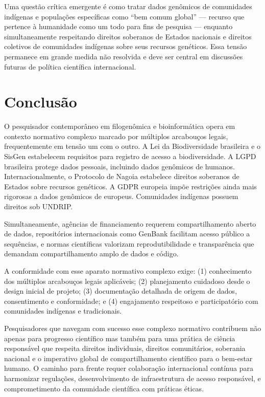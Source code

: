 Uma questão crítica emergente é como tratar dados genômicos de comunidades indígenas e populações específicas como ``bem comum global'' --- recurso que pertence à humanidade como um todo para fins de pesquisa --- enquanto simultaneamente respeitando direitos soberanos de Estados nacionais e direitos coletivos de comunidades indígenas sobre seus recursos genéticos. Essa tensão permanece em grande medida não resolvida e deve ser central em discussões futuras de política científica internacional.

\section{Conclusão}

O pesquisador contemporâneo em filogenômica e bioinformática opera em contexto normativo complexo marcado por múltiplos arcabouços legais, frequentemente em tensão um com o outro. A Lei da Biodiversidade brasileira e o SisGen estabelecem requisitos para registro de acesso a biodiversidade. A LGPD brasileira protege dados pessoais, incluindo dados genômicos de humanos. Internacionalmente, o Protocolo de Nagoia estabelece direitos soberanos de Estados sobre recursos genéticos. A GDPR europeia impõe restrições ainda mais rigorosas a dados genômicos de europeus. Comunidades indígenas possuem direitos sob UNDRIP.

Simultaneamente, agências de financiamento requerem compartilhamento aberto de dados, repositórios internacionais como GenBank facilitam acesso público a sequências, e normas científicas valorizam reprodutibilidade e transparência que demandam compartilhamento amplo de dados e código.

A conformidade com esse aparato normativo complexo exige: (1) conhecimento dos múltiplos arcabouços legais aplicáveis; (2) planejamento cuidadoso desde o design inicial de projeto; (3) documentação detalhada de origem de dados, consentimento e conformidade; e (4) engajamento respeitoso e participatório com comunidades indígenas e tradicionais.

Pesquisadores que navegam com sucesso esse complexo normativo contribuem não apenas para progresso científico mas também para uma prática de ciência responsável que respeita direitos individuais, direitos comunitários, soberania nacional e o imperativo global de compartilhamento científico para o bem-estar humano. O caminho para frente requer colaboração internacional contínua para harmonizar regulações, desenvolvimento de infraestrutura de acesso responsável, e comprometimento da comunidade científica com práticas éticas.

